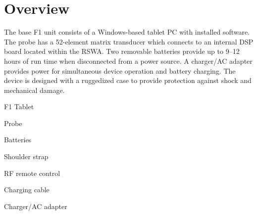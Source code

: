 \chapter[overview]{Overview}

The base F1 unit consists of a Windows-based tablet PC with installed software.
The probe has a 52-element matrix transducer which connects to an internal DSP
board located within the RSWA. Two removable batteries provide up to 9–12 hours
of run time when disconnected from a power source. A charger/AC adapter provides
power for simultaneous device operation and battery charging. The device is
designed with a ruggedized case to provide protection against shock and
mechanical damage.


\startnarrow[middle=6em]
\startcolumns[n=2]
\startitemize[n,packed][stopper=.]
\item
F1 Tablet
\item
Probe
\item
Batteries
\item
Shoulder strap
\item
RF remote control
\item
Charging cable
\item
Charger/AC adapter
\stopitemize
\stopcolumns
\stopnarrow